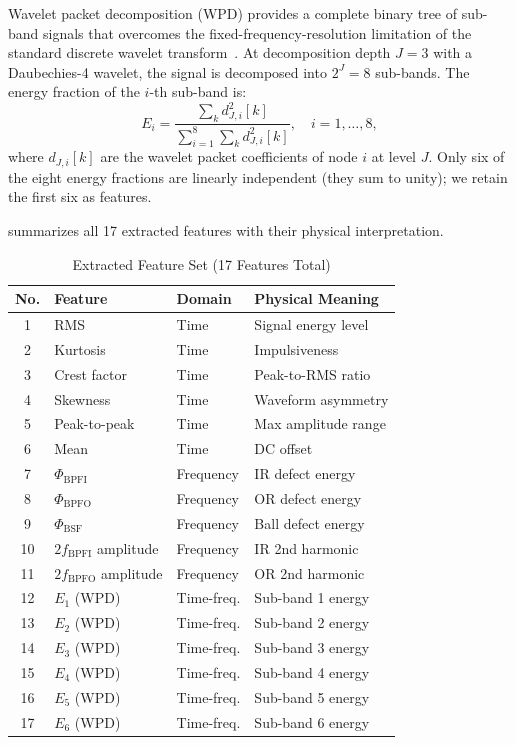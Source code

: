 \documentclass[conference,a4paper]{IEEEtran}[2015/08/26]
\begin{document}
Wavelet packet decomposition (WPD) provides a complete binary tree
of sub-band signals that overcomes the fixed-frequency-resolution
limitation of the standard discrete wavelet transform~\cite{Mallat2009}.
At decomposition depth $J = 3$ with a Daubechies-4 wavelet, the signal
is decomposed into $2^J = 8$ sub-bands. The energy fraction of the
$i$-th sub-band is:
\begin{equation}
  E_i = \frac{\sum_{k} d_{J,i}^2[k]}{\sum_{i=1}^{8} \sum_{k} d_{J,i}^2[k]},
  \quad i = 1, \ldots, 8,
  \label{eq:wpd_energy}
\end{equation}
where $d_{J,i}[k]$ are the wavelet packet coefficients of node $i$ at
level $J$. Only six of the eight energy fractions are linearly independent
(they sum to unity); we retain the first six as features.

 summarizes all 17 extracted features with their
physical interpretation.

\begin{table}[t]
  \caption{Extracted Feature Set (17 Features Total)}
  \label{tab:features}
  \centering
  \begin{tabular}{clll}
    \toprule
    \textbf{No.} & \textbf{Feature} & \textbf{Domain} & \textbf{Physical Meaning} \\
    \midrule
    1  & RMS           & Time  & Signal energy level \\
    2  & Kurtosis      & Time  & Impulsiveness \\
    3  & Crest factor  & Time  & Peak-to-RMS ratio \\
    4  & Skewness      & Time  & Waveform asymmetry \\
    5  & Peak-to-peak  & Time  & Max amplitude range \\
    6  & Mean          & Time  & DC offset \\
    7  & $\Phi_{\text{BPFI}}$ & Frequency & IR defect energy \\
    8  & $\Phi_{\text{BPFO}}$ & Frequency & OR defect energy \\
    9  & $\Phi_{\text{BSF}}$  & Frequency & Ball defect energy \\
    10 & $2f_{\text{BPFI}}$ amplitude & Frequency & IR 2nd harmonic \\
    11 & $2f_{\text{BPFO}}$ amplitude & Frequency & OR 2nd harmonic \\
    12 & $E_1$ (WPD)   & Time-freq. & Sub-band 1 energy \\
    13 & $E_2$ (WPD)   & Time-freq. & Sub-band 2 energy \\
    14 & $E_3$ (WPD)   & Time-freq. & Sub-band 3 energy \\
    15 & $E_4$ (WPD)   & Time-freq. & Sub-band 4 energy \\
    16 & $E_5$ (WPD)   & Time-freq. & Sub-band 5 energy \\
    17 & $E_6$ (WPD)   & Time-freq. & Sub-band 6 energy \\
    \bottomrule
  \end{tabular}
\end{table}
\end{document}
